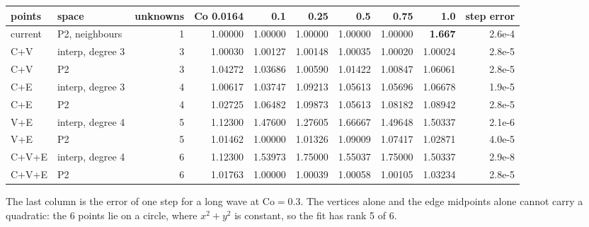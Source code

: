 \documentclass[11pt,a4paper]{article}
\begin{document}
\begin{center}
\small
\begin{tabular}{llrrrrrrrr}
\toprule
points & space & unknowns & Co 0.0164 & 0.1 & 0.25 & 0.5 & 0.75 & 1.0 & step error \\
\midrule
current & P2, neighbours & 1 & 1.00000 & 1.00000 & 1.00000 & 1.00000 & 1.00000 & \textbf{1.667} & 2.6e-4 \\
\midrule
C+V   & interp, degree 3 & 3 & 1.00030 & 1.00127 & 1.00148 & 1.00035 & 1.00020 & 1.00024 & 2.8e-5 \\
C+V   & P2               & 3 & 1.04272 & 1.03686 & 1.00590 & 1.01422 & 1.00847 & 1.06061 & 2.8e-5 \\
C+E   & interp, degree 3 & 4 & 1.00617 & 1.03747 & 1.09213 & 1.05613 & 1.05696 & 1.06678 & 1.9e-5 \\
C+E   & P2               & 4 & 1.02725 & 1.06482 & 1.09873 & 1.05613 & 1.08182 & 1.08942 & 2.8e-5 \\
V+E   & interp, degree 4 & 5 & 1.12300 & 1.47600 & 1.27605 & 1.66667 & 1.49648 & 1.50337 & 2.1e-6 \\
V+E   & P2               & 5 & 1.01462 & 1.00000 & 1.01326 & 1.09009 & 1.07417 & 1.02871 & 4.0e-5 \\
C+V+E & interp, degree 4 & 6 & 1.12300 & 1.53973 & 1.75000 & 1.55037 & 1.75000 & 1.50337 & 2.9e-8 \\
C+V+E & P2               & 6 & 1.01763 & 1.00000 & 1.00039 & 1.00058 & 1.00105 & 1.03234 & 2.8e-5 \\
\bottomrule
\end{tabular}
\end{center}

The last column is the error of one step for a long wave at \(\mathrm{Co} = 0.3\). The vertices
alone and the edge midpoints alone cannot carry a quadratic: the 6 points lie on a circle,
where \(x^2 + y^2\) is constant, so the fit has rank 5 of 6.
\end{document}
